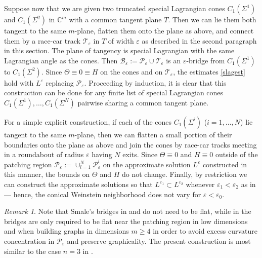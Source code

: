 \documentclass[11pt]{amsart}
\theoremstyle{definition}
\theoremstyle{remark}
\newtheorem{remark}{Remark}
\newcommand{\C}{\mathbb{C}}
\begin{document}
Suppose now that we are given two truncated special Lagrangian cones $C_1(\Sigma^1)$ and $C_1(\Sigma^2)$ in $\C^m$ with a common tangent plane $T$. Then we can lie them both tangent to the same $m$-plane, flatten them onto the plane as above, and connect them by a race-car track $\mathscr{T}_\varepsilon$ in $T$ of width $\varepsilon$ as described in the second paragraph in this section. The plane of tangency is special Lagrangian with the same Lagrangian angle as the cones. Then $\mathscr{B}_\varepsilon := \mathscr{P}_\varepsilon \cup \mathscr{T}_\varepsilon$ is an $\varepsilon$-bridge from $C_1(\Sigma^1)$ to $C_1(\Sigma^2)$. Since $\Theta \equiv 0 \equiv H$ on the cones and on $\mathscr{T}_\varepsilon$, the estimates \eqref{slagest} hold with $L^\varepsilon$ replacing $\mathscr{P}_\varepsilon$. Proceeding by induction, it is clear that this construction can be done for any finite list of special Lagrangian cones $C_1(\Sigma^1), \ldots, C_1(\Sigma^N)$ pairwise sharing a common tangent plane. 

For a simple explicit construction, if each of the cones $C_1(\Sigma^i)$ ($i = 1,\ldots, N$) lie tangent to the same $m$-plane, then we can flatten a small portion of their boundaries onto the plane as above and join the cones by race-car tracks meeting in a roundabout of radius $\varepsilon$ having $N$ exits. Since $\Theta \equiv 0$ and $H \equiv 0$ outside of the patching region $\mathscr{P}_\varepsilon := \cup_{l = 1}^N \mathscr{P}_{\varepsilon}^l$ on the approximate solution $L^\varepsilon$ constructed in this manner, the bounds on $\Theta$ and $H$ do not change. Finally, by restriction we can construct the approximate solutions so that $L^{\varepsilon_1} \subset L^{\varepsilon_2}$ whenever $\varepsilon_1 < \varepsilon_2$ as in \cite{Sm87, Dim25} --- hence, the conical Weinstein neighborhood does not vary for $\varepsilon < \varepsilon_0$.


\begin{remark}
    Note that Smale's bridges in \cite{Sm87} and \cite{Sm89} do not need to be flat, while in \cite{Dim25} the bridges are only required to be flat near the patching region in low dimensions and when building graphs in dimensions $m \ge 4$ in order to avoid excess curvature concentration in $\mathscr{P}_\varepsilon$ and preserve graphicality. The present construction is most similar to the case $n =3 $ in \cite[Section 7.2]{Dim25}.
\end{remark}
\end{document}
